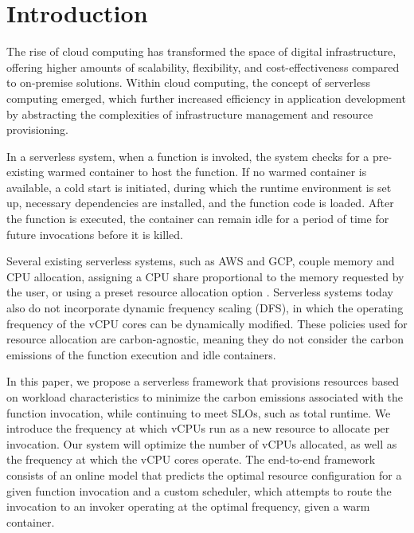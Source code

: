 \documentclass[times, 10pt,twocolumn]{article}
\begin{document}
\section{Introduction}

The rise of cloud computing has transformed the space of digital infrastructure, offering higher amounts of scalability, flexibility, and cost-effectiveness compared to on-premise solutions. Within cloud computing, the concept of serverless computing emerged, which further increased efficiency in application development by abstracting the complexities of infrastructure management and resource provisioning. 

In a serverless system, when a function is invoked, the system checks for a pre-existing warmed container to host the function. If no warmed container is available, a cold start is initiated, during which the runtime environment is set up, necessary dependencies are installed, and the function code is loaded. After the function is executed, the container can remain idle for a period of time for future invocations before it is killed.

Several existing serverless systems, such as AWS and GCP, couple memory and CPU allocation, assigning a CPU share proportional to the memory requested by the user, or using a preset resource allocation option \cite{bibal2023acm}. Serverless systems today also do not incorporate dynamic frequency scaling (DFS), in which the operating frequency of the vCPU cores can be dynamically modified. These policies used for resource allocation are carbon-agnostic, meaning they do not consider the carbon emissions of the function execution and idle containers.

In this paper, we propose a serverless framework that provisions resources based on workload characteristics to minimize the carbon emissions associated with the function invocation, while continuing to meet SLOs, such as total runtime. We introduce the frequency at which vCPUs run as a new resource to allocate per invocation. Our system will optimize the number of vCPUs allocated, as well as the frequency at which the vCPU cores operate. The end-to-end framework consists of an online model that predicts the optimal resource configuration for a given function invocation and a custom scheduler, which attempts to route the invocation to an invoker operating at the optimal frequency, given a warm container. 
\end{document}
